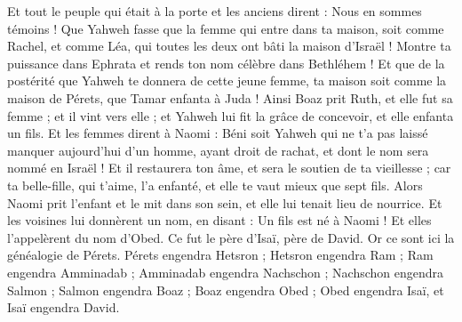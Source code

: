 \begin{multicols}{2}
Et tout le peuple qui était à la porte et les anciens dirent : Nous en sommes témoins ! Que Yahweh fasse que la femme qui entre dans ta maison, soit comme Rachel, et comme Léa, qui toutes les deux ont bâti la maison d'Israël ! Montre ta puissance dans Ephrata et rends ton nom célèbre dans Bethléhem !
Et que de la postérité que Yahweh te donnera de cette jeune femme, ta maison soit comme la maison de Pérets, que Tamar enfanta à Juda !
Ainsi Boaz prit Ruth, et elle fut sa femme ; et il vint vers elle ; et Yahweh lui fit la grâce de concevoir, et elle enfanta un fils.
Et les femmes dirent à Naomi : Béni soit Yahweh qui ne t'a pas laissé manquer aujourd'hui d'un homme, ayant droit de rachat, et dont le nom sera nommé en Israël !
Et il restaurera ton âme, et sera le soutien de ta vieillesse ; car ta belle-fille, qui t'aime, l'a enfanté, et elle te vaut mieux que sept fils.
Alors Naomi prit l'enfant et le mit dans son sein, et elle lui tenait lieu de nourrice.
Et les voisines lui donnèrent un nom, en disant : Un fils est né à Naomi ! Et elles l'appelèrent du nom d'Obed. Ce fut le père d'Isaï, père de David.
Or ce sont ici la généalogie de Pérets. Pérets engendra Hetsron ;
Hetsron engendra Ram ; Ram engendra Amminadab ;
Amminadab engendra Nachschon ; Nachschon engendra Salmon ;
Salmon engendra Boaz ; Boaz engendra Obed ;
Obed engendra Isaï, et Isaï engendra David.
\PPE{}
\end{multicols}
